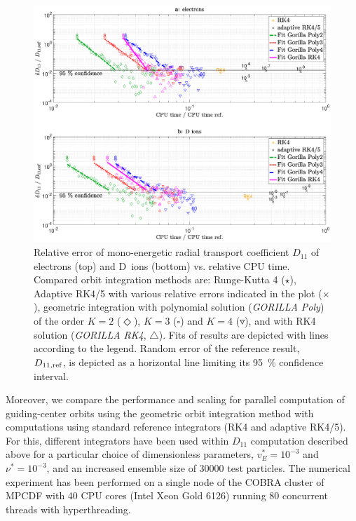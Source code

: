 \documentclass[./main.tex]{subfiles}
\begin{document}
\begin{figure}[t]
	\centerline{\includegraphics[keepaspectratio,width=1.1\linewidth]{figures/cpu_speed_electrons_dions.eps}}
	\captionsetup{justification=raggedright,singlelinecheck=false,textfont=footnotesize,labelfont=footnotesize}
	\caption{Relative error of mono-energetic radial transport coefficient
	$D_{11}$ of electrons (top) and D~ions (bottom) vs. relative CPU time.
	Compared orbit integration methods are:
	Runge-Kutta 4 ($\star$),
	Adaptive RK4/5 with various relative errors indicated in the plot ($\times$),
	geometric integration with polynomial solution
	(\textit{GORILLA Poly}) of the order $K=2$ ($\Diamond$), $K=3$ ($\square$) and $K=4$
	($\triangledown$), and with RK4 solution (\textit{GORILLA RK4}, $\triangle$).
	Fits of results are depicted with lines according to the legend.
	Random error of the reference result, $D_{11,\rm{ref}}$,
	is depicted as a horizontal line limiting its 95~\% confidence interval.
	}
	\label{fig:cpu_speed_electrons_dions}
\end{figure}
%
Moreover, we compare the performance and scaling for parallel computation of guiding-center orbits
using the geometric orbit integration method with
computations using standard reference integrators (RK4 and adaptive RK4/5).
For this, different integrators have been used within $D_{11}$ computation described above
for a particular choice of dimensionless parameters, $v_E^\ast = 10^{-3}$ and $\nu^\ast =  10^{-3}$,
and an increased ensemble size of $30000$ test particles.
The numerical experiment has been performed on a single node of the COBRA cluster
of MPCDF with 40 CPU cores (Intel Xeon Gold 6126) running 80 concurrent threads with hyperthreading.
\end{document}
